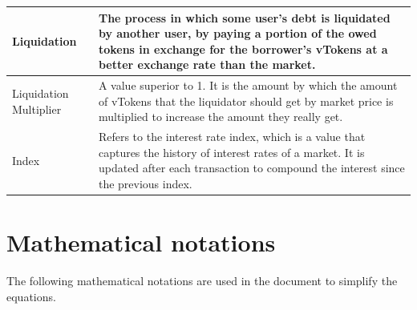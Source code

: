 \begin{tabularx}{\linewidth}{|l|X|}
  Liquidation & The process in which some user's debt is liquidated by another user, by paying a portion of the owed tokens in exchange for the borrower's vTokens at a better exchange rate than the market. \\\hline

  Liquidation Multiplier & A value superior to 1. It is the amount by which the amount of vTokens that the liquidator should get by market price is multiplied to increase the amount they really get. \\\hline

  Index & Refers to the interest rate index, which is a value that captures the history of interest rates of a market. It is updated after each transaction to compound the interest since the previous index. \\\hline
\end{tabularx}

\newpage
\section{Mathematical notations}
\label{spec:mn}
The following mathematical notations are used in the document to simplify the equations.

\newcommand\USD{\mathit{USD}}

\newcommand\M[1]{\mathit{m_{#1}}}
\newcommand\T[1]{\mathit{T_{#1}}}
\newcommand\vT[1]{\mathit{vT_{#1}}}

\newcommand\ER[2]{\mathit{ER(#1, #2)}}

\newcommand\BA[1]{\mathit{Ba(#1)}}
\newcommand\C[1]{\mathit{C(#1)}}

\newcommand\UR[1]{\mathit{UR_{#1}}}
\newcommand\UMul[1]{\mathit{UM_{#1}}}
\newcommand\UBR[1]{\mathit{UbR_{#1}}}
\newcommand\BIR[1]{\mathit{BIR_{#1}}}
\newcommand\RF[1]{\mathit{RF_{#1}}}

\newcommand\RTB[1]{\mathit{rTB(#1)}}
\newcommand\VTB[1]{\mathit{vTB_{#1}}}
\newcommand\RES[1]{\mathit{Res_{#1}}}

\newcommand\CF[1]{\mathit{CF(#1)}}
\newcommand\LMul[1]{\mathit{LMul(#1)}}
\newcommand\AH[1]{\mathit{AH_{#1}}}
\newcommand\BC[1]{\mathit{BC_{#1}}}
\newcommand\SI[1]{\mathit{SI_{#1}}}
\newcommand\BI[1]{\mathit{BI_{#1}}}
\newcommand\uvTA[2]{\mathit{uvTA_{#1, #2}}}


\newcommand\IND[2]{\mathit{Ind_{#1, #2}}}
\newcommand\INDL[1]{\mathit{Indl_{#1}}}
\newcommand\AI[1]{\mathit{AI_{#1}}}
\newcommand\SIF[1]{\mathit{SIF_{#1}}}

